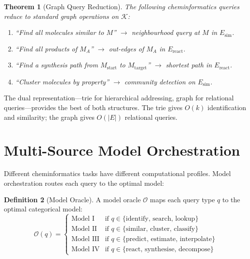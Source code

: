 \documentclass[11pt,twocolumn,a4paper]{article}
\newtheorem{theorem}{Theorem}[section]
\theoremstyle{definition}
\newtheorem{definition}[theorem]{Definition}
\theoremstyle{remark}
\newcommand{\KGraph}{\mathcal{K}}
\newcommand{\Oracle}{\mathcal{O}}
\begin{document}
\begin{theorem}[Graph Query Reduction]
\label{thm:graph_query}
The following cheminformatics queries reduce to standard graph operations on $\KGraph$:
\begin{enumerate}[nosep]
\item ``Find all molecules similar to $M$'' $\to$ neighbourhood query at $M$ in $E_{\mathrm{sim}}$.
\item ``Find all products of $M_A$'' $\to$ out-edges of $M_A$ in $E_{\mathrm{react}}$.
\item ``Find a synthesis path from $M_{\mathrm{start}}$ to $M_{\mathrm{target}}$'' $\to$ shortest path in $E_{\mathrm{react}}$.
\item ``Cluster molecules by property'' $\to$ community detection on $E_{\mathrm{sim}}$.
\end{enumerate}
\end{theorem}

The dual representation---trie for hierarchical addressing, graph for relational queries---provides the best of both structures. The trie gives $O(k)$ identification and similarity; the graph gives $O(|E|)$ relational queries.


\section{Multi-Source Model Orchestration}
\label{sec:orchestration}

Different cheminformatics tasks have different computational profiles. Model orchestration routes each query to the optimal model:

\begin{definition}[Model Oracle]
\label{def:oracle}
A model oracle $\Oracle$ maps each query type $q$ to the optimal categorical model:
\begin{equation}
\Oracle(q) = \begin{cases}
\text{Model I} & \text{if } q \in \{\text{identify, search, lookup}\} \\
\text{Model II} & \text{if } q \in \{\text{similar, cluster, classify}\} \\
\text{Model III} & \text{if } q \in \{\text{predict, estimate, interpolate}\} \\
\text{Model IV} & \text{if } q \in \{\text{react, synthesise, decompose}\}
\end{cases}
\label{eq:oracle}
\end{equation}
\end{definition}
\end{document}
